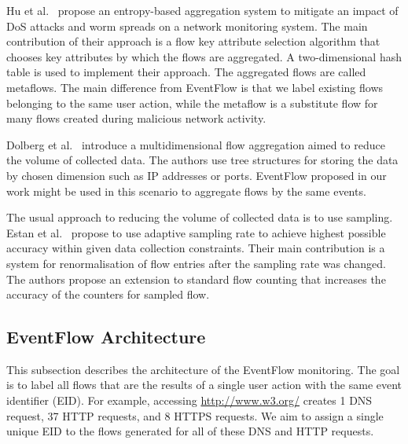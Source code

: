Hu et al.~\cite{Hu-2009-Entropy} propose an entropy-based aggregation system to mitigate an impact of DoS attacks and worm spreads on a network monitoring system. The main contribution of their approach is a flow key attribute selection algorithm that chooses key attributes by which the flows are aggregated. A two-dimensional hash table is used to implement their approach. The aggregated flows are called metaflows. The main difference from EventFlow is that we label existing flows belonging to the same user action, while the metaflow is a substitute flow for many flows created during malicious network activity.

Dolberg et al.~\cite{Dolberg-2012-Efficient} introduce a multidimensional flow aggregation aimed to reduce the volume of collected data. The authors use tree structures for storing the data by chosen dimension such as IP addresses or ports. EventFlow proposed in our work might be used in this scenario to aggregate flows by the same events.

The usual approach to reducing the volume of collected data is to use sampling. Estan et al.~\cite{Estan-2004-Building} propose to use adaptive sampling rate to achieve highest possible accuracy within given data collection constraints. Their main contribution is a system for renormalisation of flow entries after the sampling rate was changed. The authors propose an extension to standard flow counting that increases the accuracy of the counters for sampled flow.


\subsection{EventFlow Architecture} \label{subsec:eventflow-architecture}

This subsection describes the architecture of the EventFlow monitoring. The goal is to label all flows that are the results of a single user action with the same event identifier (EID). For example, accessing \url{http://www.w3.org/} creates 1 DNS request, 37 HTTP requests, and 8 HTTPS requests. We aim to assign a single unique EID to the flows generated for all of these DNS and HTTP requests.

